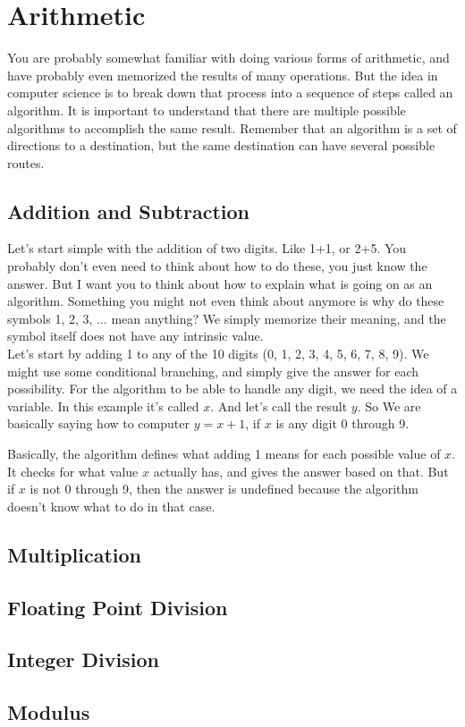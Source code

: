 \chapter{Arithmetic}

You are probably somewhat familiar with doing various forms of arithmetic, and have probably even memorized the results of many operations. But the idea in computer science is to break down that process into a sequence of steps called an algorithm. It is important to understand that there are multiple possible algorithms to accomplish the same result. Remember that an algorithm is a set of directions to a destination, but the same destination can have several possible routes.

\section{Addition and Subtraction}

Let's start simple with the addition of two digits. Like 1+1, or 2+5. You probably don't even need to think about how to do these, you just know the answer. But I want you to think about how to explain what is going on as an algorithm. Something you might not even think about anymore is why do these symbols 1, 2, 3, ... mean anything? We simply memorize their meaning, and the symbol itself does not have any intrinsic value.\\

Let's start by adding 1 to any of the 10 digits (0, 1, 2, 3, 4, 5, 6, 7, 8, 9). We might use some conditional branching, and simply give the answer for each possibility. For the algorithm to be able to handle any digit, we need the idea of a variable. In this example it's called \(x\). And let's call the result \(y\). So We are basically saying how to computer \(y = x+1\), if \(x\) is any digit 0 through 9.\\

\begin{center}\end{center}

Basically, the algorithm defines what adding 1 means for each possible value of \(x\). It checks for what value \(x\) actually has, and gives the answer based on that. But if \(x\) is not 0 through 9, then the answer is undefined because the algorithm doesn't know what to do in that case.\\



\section{Multiplication}

\section{Floating Point Division}

\section{Integer Division}

\section{Modulus}
